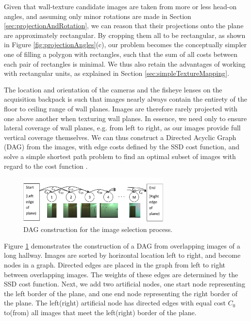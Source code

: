 \documentclass[10pt,twocolumn,letterpaper]{article}
\begin{document}
Given that wall-texture candidate images are taken from more or less
head-on angles, and assuming only minor rotations are made in Section
\ref{sec:projectionAndRotation}, we can reason that their projections
onto the plane are approximately rectangular. By cropping them all to
be rectangular, as shown in Figure \ref{fig:projectionAngles}(c), our
problem becomes the conceptually simpler one of filling a polygon with
rectangles, such that the sum of all costs between each pair of
rectangles is minimal. We thus also retain the advantages of working
with rectangular units, as explained in Section
\ref{sec:simpleTextureMapping}.

The location and orientation of the cameras and the fisheye lenses on
the acquisition backpack is such that images nearly always contain the
entirety of the floor to ceiling range of wall planes. Images are
therefore rarely projected with one above another when texturing wall
planes. In essence, we need only to ensure lateral coverage of wall
planes, e.g. from left to right, as our images provide full vertical
coverage themselves. We can thus construct a Directed Acyclic Graph
(DAG) from the images, with edge costs defined by the SSD cost
function, and solve a simple shortest path problem to find an optimal
subset of images with regard to the cost function \cite{dijkstra}.

\begin{figure}
  \centering
  \includegraphics[width=3in]{dagCreation.pdf}
  \caption{DAG construction for the image selection process. \\}
  \label{fig:dagCreation}
\end{figure}

Figure \ref{fig:dagCreation} demonstrates the construction of a DAG
from overlapping images of a long hallway. Images are sorted by
horizontal location left to right, and become nodes in a
graph. Directed edges are placed in the graph from left to right
between overlapping images. The weights of these edges are determined
by the SSD cost function. Next, we add two artificial nodes, one start
node representing the left border of the plane, and one end node
representing the right border of the plane. The left(right) artificial
node has directed edges with equal cost $C_0$ to(from) all images that
meet the left(right) border of the plane.
\end{document}
